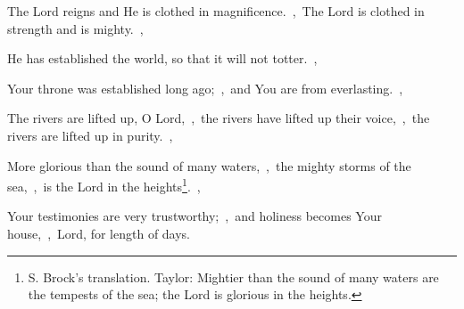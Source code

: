 \documentclass[12pt,twoside,a5paper]{article}
\begin{document}


\begin{normalparskip}
  The Lord reigns and He is clothed in magnificence.~\sep\ The Lord is clothed in strength and is mighty.~\sep


  He has established the world, so that it will not totter.~\sep

  Your throne was established long ago;~\sep\ and You are from everlasting.~\sep

  The rivers are lifted up, O Lord,~\sep\ the rivers have lifted up their voice,~\sep\ the rivers are lifted up in purity.~\sep

  More glorious than the sound of many waters,~\sep\ the mighty storms of the sea,~\sep\ is the Lord in the heights\footnote{S. Brock's translation. Taylor: Mightier than the sound of many waters are the tempests of the sea; the Lord is glorious in the heights.}.~\sep

  Your testimonies are very trustworthy;~\sep\ and holiness becomes Your house,~\sep\ Lord, for length of days.
\end{normalparskip}

\end{document}
